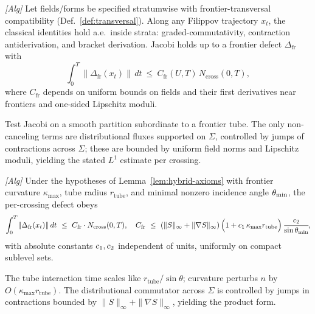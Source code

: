\begin{lemma}\label{lem:hybrid-axioms}
\emph{[\textup{Alg}]} Let fields/forms be specified stratumwise with frontier-transversal compatibility (Def.~\ref{def:transversal}). Along any Filippov trajectory $x_t$, the classical identities hold a.e.\ inside strata: graded-commutativity, contraction antiderivation, and bracket derivation. Jacobi holds up to a frontier defect $\Delta_{\mathrm{fr}}$ with
\[
\int_0^T\|\Delta_{\mathrm{fr}}(x_t)\|\,dt \ \le\ C_{\mathrm{fr}}(U,T)\,N_{\mathrm{cross}}(0,T),
\]
where $C_{\mathrm{fr}}$ depends on uniform bounds on fields and their first derivatives near frontiers and one-sided Lipschitz moduli.
\begin{proofsketch}
Test Jacobi on a smooth partition subordinate to a frontier tube. The only non-canceling terms are distributional fluxes supported on $\Sigma$, controlled by jumps of contractions across $\Sigma$; these are bounded by uniform field norms and Lipschitz moduli, yielding the stated $L^1$ estimate per crossing.
\end{proofsketch}
\end{lemma}

\begin{lemma}\label{lem:jacobi-upgraded}
\emph{[\textup{Alg}]}
Under the hypotheses of Lemma~\ref{lem:hybrid-axioms} with frontier curvature $\kappa_{\max}$, tube radius $r_{\mathrm{tube}}$, and minimal nonzero incidence angle $\theta_{\min}$, the per-crossing defect obeys
\[
\int_0^T\!\|\Delta_{\mathrm{fr}}(x_t)\|\,dt \ \le\ C_{\mathrm{fr}}\cdot N_{\mathrm{cross}}(0,T),\quad
C_{\mathrm{fr}}\ \le\ (\|S\|_\infty+\|\nabla S\|_\infty)\,\Big(1+c_{1}\,\kappa_{\max} r_{\mathrm{tube}}\Big)\,\frac{c_{2}}{\sin\theta_{\min}}\!,
\]
with absolute constants $c_{1},c_{2}$ independent of units, uniformly on compact sublevel sets.
\begin{proofsketch}
The tube interaction time scales like $r_{\mathrm{tube}}/\sin\theta$; curvature perturbs $n$ by $O(\kappa_{\max}r_{\mathrm{tube}})$. The distributional commutator across $\Sigma$ is controlled by jumps in contractions bounded by $\|S\|_\infty+\|\nabla S\|_\infty$, yielding the product form. 
\end{proofsketch}
\end{lemma}

